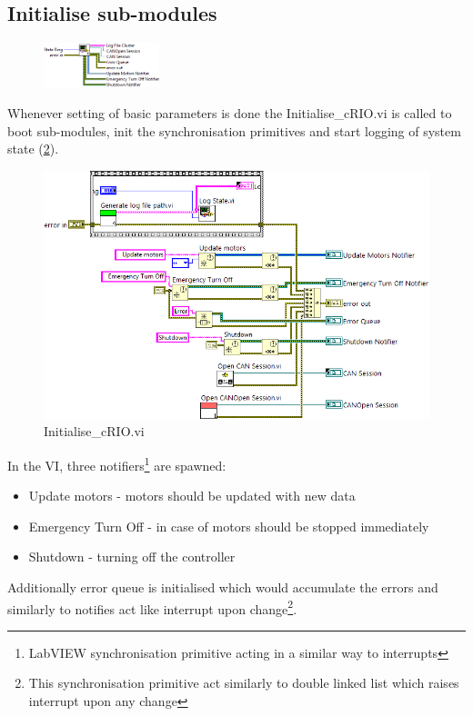 \subsection{Initialise sub-modules}
\begin{figure}
    \vspace{-15pt}
    \centering
    \includegraphics[scale=\visc,max width=0.3\textwidth]{figures/Initialise_cRIOc}
    \caption*{}
    \label{vi:init_crioc}
    \vspace{-15pt}
\end{figure}
Whenever setting of basic parameters is done the Initialise\_cRIO.vi is called to boot sub-modules, init the synchronisation primitives and start logging of system state (\ref{vi:init_crioc}).
\begin{figure}[!h]
    \centering
    \includegraphics[scale=\visc,max width=\textwidth]{figures/Initialise_cRIOd.png}
    \caption{Initialise\_cRIO.vi}
    \label{vi:init_crioc}
\end{figure}

In the VI, three notifiers\footnote{LabVIEW synchronisation primitive acting in a similar way to interrupts} are spawned:
\begin{itemize}
    \item Update motors - motors should be updated with new data
    \item Emergency Turn Off - in case of motors should be stopped immediately
    \item Shutdown - turning off the controller
\end{itemize}
Additionally error queue is initialised which would accumulate the errors and similarly to notifies act like interrupt upon change\footnote{This synchronisation primitive act similarly to double linked list which raises interrupt upon any change}.

